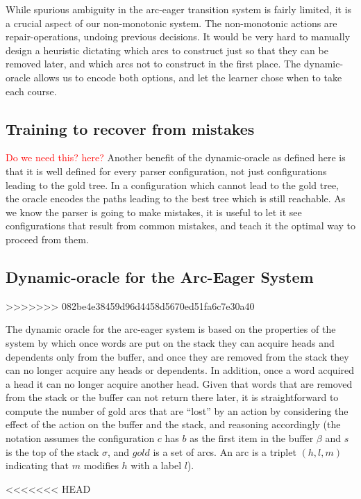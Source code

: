 \documentclass[11pt,letterpaper]{article}
\newcommand{\note}[1]{\textcolor{red}{#1}}
\begin{document}
While spurious ambiguity in the arc-eager transition system is fairly limited, 
it is a crucial aspect of our non-monotonic system.  The non-monotonic
actions are repair-operations, undoing previous decisions.  It would be very
hard to manually design a heuristic dictating which arcs to construct just so
that they can be removed later, and which arcs not to construct in the first
place.  The dynamic-oracle allows us to encode both options, and let the
learner chose when to take each course. 

\subsection{Training to recover from mistakes}
\note{Do we need this? here?}
Another benefit of the dynamic-oracle as defined here is that it is well
defined for every parser configuration, not just configurations leading to the
gold tree.  In a configuration which cannot lead to the gold tree, the oracle
encodes the paths leading to the best tree which is still reachable.  As we
know the parser is going to make mistakes, it is useful to let it see
configurations that result from common mistakes, and teach it the optimal way
to proceed from them.


\subsection{Dynamic-oracle for the Arc-Eager System}
>>>>>>> 082be4e38459d96d4458d5670ed51fa6c7e30a40

The dynamic oracle for the arc-eager system is based on the properties of the
system by which once words are put on the stack they can acquire heads and
dependents only from the buffer, and once they are removed from the stack they
can no longer acquire any heads or dependents. In addition, once a word
acquired a head it can no longer acquire another head.  Given that words that
are removed from the stack or the buffer can not return there later, it
is straightforward to compute the number of gold arcs that are ``lost'' by an
action by considering the effect of the action on the buffer and the stack,
and reasoning accordingly (the notation assumes the configuration $c$ has $b$
as the first item in the buffer $\beta$ and $s$ is the top of the stack
$\sigma$, and $gold$ is a set of arcs. An arc is a triplet $(h,l,m)$
indicating that $m$ modifies $h$ with a label $l$).

<<<<<<< HEAD
\end{document}
